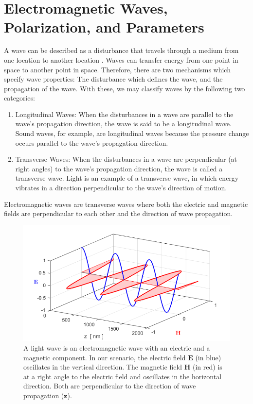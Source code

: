 \section{Electromagnetic Waves, Polarization, and Parameters}
\label{intro:electromagnetics_polarization}
A wave can be described as a disturbance that travels through a medium from one location to another location \cite{sanghera2011quantum}. Waves can transfer energy from one point in space to another point in space. Therefore, there are two mechanisms which specify wave properties: The disturbance which defines the wave, and the propagation of the wave. With these, we may classify waves by the following two categories:
\begin{enumerate}
    \item Longitudinal Waves: When the disturbances in a wave are parallel to the wave's propagation direction, the wave is said to be a longitudinal wave. Sound waves, for example, are longitudinal waves because the pressure change occurs parallel to the wave's propagation direction. 
    \item Transverse Waves: When the disturbances in a wave are perpendicular (at right angles) to the wave's propagation direction, the wave is called a transverse wave. Light is an example of a transverse wave, in which energy vibrates in a direction perpendicular to the wave's direction of motion. 
\end{enumerate}
Electromagnetic waves are transverse waves where both the electric and magnetic fields are perpendicular to each other and the direction of wave propagation.

\vspace{-18mm}
%
%
\begin{figure}[H]
\begin{center}
\includegraphics[scale=0.85]{figures/EM_Wave_5.png}
\vspace{0.05 mm}
\caption{A light wave is an electromagnetic wave with an electric and a magnetic component. In our scenario, the electric field $\textbf{E}$ (in blue) oscillates in the vertical direction. The magnetic field $\textbf{H}$ (in red) is at a right angle to the electric field and oscillates in the horizontal direction. Both are perpendicular to the direction of wave propagation ($\textbf{z}$).}
\end{center}
\end{figure}
\vspace{-23mm}

